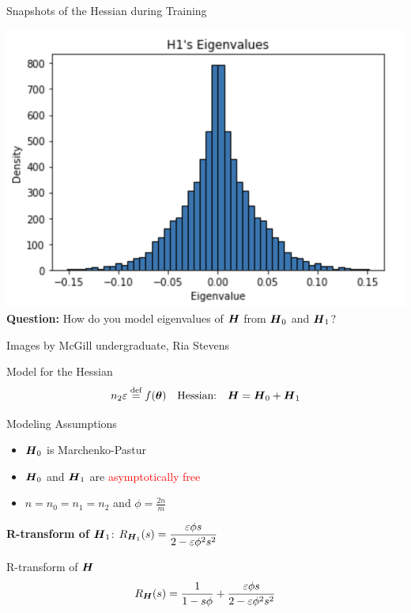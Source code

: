 \documentclass[10pt]{beamer}
\newcommand{\themename}{\textbf{\textsc{metropolis}}\xspace}
\begin{document}
\begin{frame}{Snapshots of the Hessian during Training}
\begin{center}
          \includegraphics[scale = 0.3]{part-2-images/Hessian_H_1.png}\\
          \textbf{Question:} How do you model eigenvalues of ${\boldsymbol H}$ from ${\boldsymbol H}_0$ and ${\boldsymbol H}_1$?
    \end{center}
    
    
    \hfill { \footnotesize Images by McGill undergraduate, Ria Stevens }
\end{frame}

\begin{frame}{Model for the Hessian}
\[n_2 \varepsilon \stackrel{\text{def}}{=} f({\boldsymbol \theta}) \quad \text{Hessian:} \quad {\boldsymbol H} = {\boldsymbol H}_0 + {\boldsymbol H}_1\]

\begin{exampleblock}{Modeling Assumptions}
\begin{itemize}
    \item ${\boldsymbol H}_0$ is Marchenko-Pastur
    \item ${\boldsymbol H}_0$ and ${\boldsymbol H}_1$ are \textcolor{red}{asymptotically free}
    \item $n = n_0 = n_1 = n_2$ and $\phi = \frac{2n}{m}$
\end{itemize}
\end{exampleblock}
\textbf{R-transform of ${\boldsymbol H}_1$}: \qquad $\displaystyle R_{{\boldsymbol H}_1}(s) = \frac{\varepsilon \phi s}{2-\varepsilon \phi^2 s^2}$
\begin{alertblock}{R-transform of ${\boldsymbol H}$}
  \[R_{{\boldsymbol H}}(s) = \frac{1}{1-s \phi} + \frac{\varepsilon \phi s}{2-\varepsilon \phi^2 s^2}\]
\end{alertblock}
\end{frame}


\end{document}
